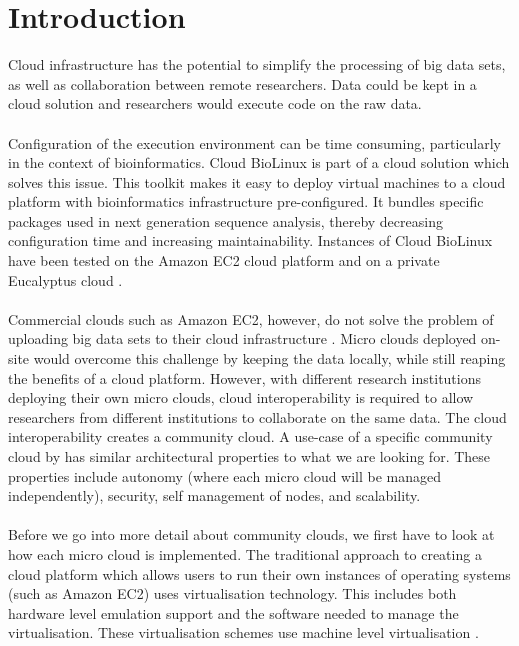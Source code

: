 \documentclass{sig-alternate-05-2015}
\begin{document}
\section{Introduction}
Cloud infrastructure has the potential to simplify the processing of big data sets, as well as collaboration between remote researchers. Data could be kept in a cloud solution and researchers would execute code on the raw data.
\\
\\
Configuration of the execution environment can be time consuming, particularly in the context of bioinformatics. Cloud BioLinux is part of a cloud solution which solves this issue. This toolkit makes it easy to deploy virtual machines to a cloud platform with bioinformatics infrastructure pre-configured. It bundles specific packages used in next generation sequence analysis, thereby decreasing configuration time and increasing maintainability. Instances of Cloud BioLinux have been tested on the Amazon EC2 cloud platform and on a private Eucalyptus cloud \cite{krampis2012cloud}. 
\\
\\
Commercial clouds such as Amazon EC2, however, do not solve the problem of uploading big data sets to their cloud infrastructure \cite{baker2010next}. Micro clouds deployed on-site would overcome this challenge by keeping the data locally, while still reaping the benefits of a cloud platform. However, with different research institutions deploying their own micro clouds, cloud interoperability is required to allow researchers from different institutions to collaborate on the same data. The cloud interoperability creates a community cloud. A use-case of a specific community cloud  by \cite{jimenez2014deploying} has similar architectural properties to what we are looking for. These properties include autonomy (where each micro cloud will be managed independently), security, self management of nodes, and scalability.
\\
\\
Before we go into more detail about community clouds, we first have to look at how each micro cloud is implemented. The traditional approach to creating a cloud platform which allows users to run their own instances of operating systems (such as Amazon EC2) uses virtualisation technology. This includes both hardware level emulation support and the software needed to manage the virtualisation. These virtualisation schemes use machine level virtualisation \cite{fink2014docker}. \\\\
\end{document}
